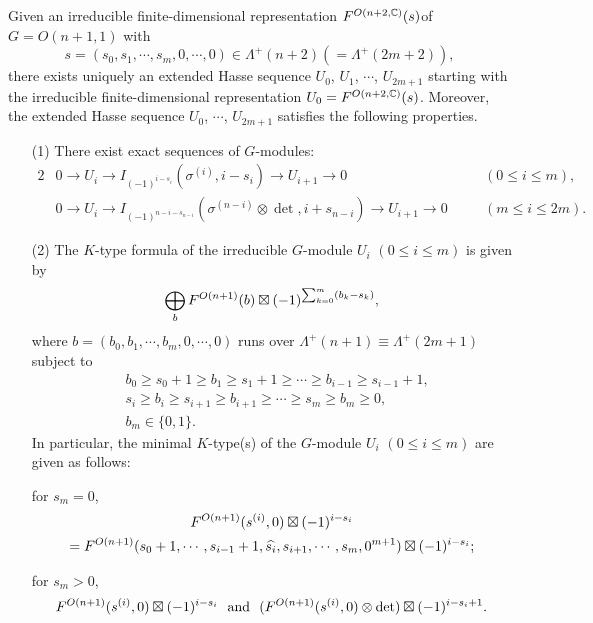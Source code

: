 \begin{theorem}
[$n=2m$]
\label{thm:171426}
Given an irreducible finite-dimensional representation
 $F^{{O(n+2,{\mathbb{C}})}}({s})$of $G=O(n+1,1)$
 with 
\[
s =(s_0, s_1, \cdots, s_m,0,\cdots,0)\in \Lambda^+(n+2)
(=\Lambda^+(2m+2)), 
\]
 there exists uniquely an extended
Hasse sequence $U_0$, $U_1$, $\cdots$, $U_{2m+1}$
 starting with the irreducible finite-dimensional representation
 $U_0=F^{{O(n+2,{\mathbb{C}})}}({s})$.  
Moreover,
 the extended Hasse sequence $U_0$, $\cdots$, $U_{2m+1}$
 satisfies the following properties.  
\begin{enumerate}
\item[{\rm{(1)}}]
There exist exact sequences of $G$-modules:
\begin{alignat*}{2}
& 0\to U_i \to I_{(-1)^{i-s_i}}(\sigma^{(i)}, i-s_i) \to U_{i+1} \to 0
\quad
&&(0 \le i \le m), 
\\
& 0\to U_i \to I_{(-1)^{n-i-s_{n-i}}}(\sigma^{(n-i)} \otimes \det, i+s_{n-i}) \to U_{i+1} \to 0
\quad
&&(m \le i \le 2m).   
\end{alignat*}

\item[{\rm{(2)}}]
The 
$K$-type formula of the irreducible $G$-module $U_i$
 $(0 \le i \le m)$ is given by
\[
  \bigoplus_b F^{{O(n+1)}}({b}) \boxtimes 
  (-1)^{\sum_{k=0}^m(b_k-s_k)}, 
\]
where $b=(b_0, b_1, \cdots, b_m,0,\cdots,0)$
 runs over $\Lambda^+(n+1)\equiv \Lambda^+(2m+1)$
 subject to 
\begin{align*}
& b_{0} \ge s_{0}+1 \ge b_{1} \ge s_{1}+1 \ge \cdots \ge b_{i-1} \ge s_{i-1}+1, 
\\
& s_{i}\ge b_{i} \ge s_{i+1} \ge b_{i+1} \ge \cdots \ge s_{m}\ge b_{m} \ge 0, 
\\
&b_{m} \in \{0,1\}.  
\end{align*}
In particular, 
 the 
 minimal $K$-type(s) of the $G$-module $U_i$ $(0 \le i\le m)$
 are given as follows:

for $s_m=0$, 
\begin{multline*}
  F^{{O(n+1)}}({s^{(i)},0})\boxtimes (-1)^{i-s_i}
\\
  =
  F^{{O(n+1)}}({s_{0}+1, \cdots, s_{i-1}+1, \widehat{s_i}, s_{i+1}, \cdots,s_m,0^{m+1}})\boxtimes (-1)^{i-s_i};
\end{multline*}

for $s_m >0$, 
\begin{equation*}
F^{{O(n+1)}}({s^{(i)},0}) \boxtimes (-1)^{i-s_i}
\,\,
\text{ and }
\,\,
(F^{{O(n+1)}}({s^{(i)},0}) \otimes \det)\boxtimes (-1)^{i-s_i+1}.  
\end{equation*}
\end{enumerate}
\end{theorem}



